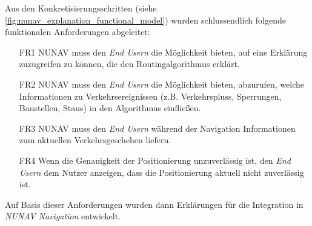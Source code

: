 Aus den Konkretisierungsschritten (siehe \autoref{fig:nunav_explanation_functional_model}) wurden schlussendlich folgende funktionalen Anforderungen abgeleitet:

\begin{enumerate}
    \item [FR1] NUNAV muss den \textit{End Usern} die Möglichkeit bieten, auf eine Erklärung zuzugreifen zu können, die den Routingalgorithmus erklärt.
    \item [FR2] NUNAV muss den \textit{End Usern} die Möglichkeit bieten, abzurufen, welche Informationen zu Verkehrsereignissen (z.B. Verkehrspluss, Sperrungen, Baustellen, Staus) in den Algorithmus einfließen.
    \item [FR3] NUNAV muss den \textit{End Usern} während der Navigation Informationen zum aktuellen Verkehrsgeschehen liefern.
    \item [FR4] Wenn die Genauigkeit der Positionierung unzuverlässig ist, den \textit{End Usern} dem Nutzer anzeigen, dass die Positionierung aktuell nicht zuverlässig ist.
\end{enumerate}

Auf Basis dieser Anforderungen wurden dann Erklärungen für die Integration in \textit{NUNAV Navigation} entwickelt.
